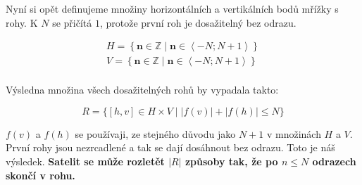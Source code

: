 \documentclass[11pt, a4paper]{article}
\begin{document}
    Nyní si opět definujeme množiny horizontálních a vertikálních bodů mřížky s rohy.
    K $N$ se přičítá $1$, protože první roh je dosažitelný bez odrazu.

    \begin{gather*}
        H = \left\{ \mathbf{n} \in \mathbb{Z} \mid \mathbf{n} \in \left\langle -N; N+1 \right\rangle \right\}\\
        V = \left\{ \mathbf{n} \in \mathbb{Z} \mid \mathbf{n} \in \left\langle -N; N+1 \right\rangle \right\}\\
    \end{gather*}

    Výsledna množina všech dosažitelných rohů by vypadala takto:

    \[
        R =  \{ [h, v] \in H \times V \mid |f(v)| + |f(h)| \leq N \}
    \]

    $f(v)$ a $f(h)$ se používaji, ze stejného důvodu jako $N+1$ v množinách $H$ a $V$.
    První rohy jsou nezrcadlené a tak se dají dosáhnout bez odrazu.
    Toto je náš výsledek.
    \textbf{Satelit se může rozletět $|R|$ způsoby tak, že po $n \leq N$ odrazech skončí v rohu.}
\end{document}
